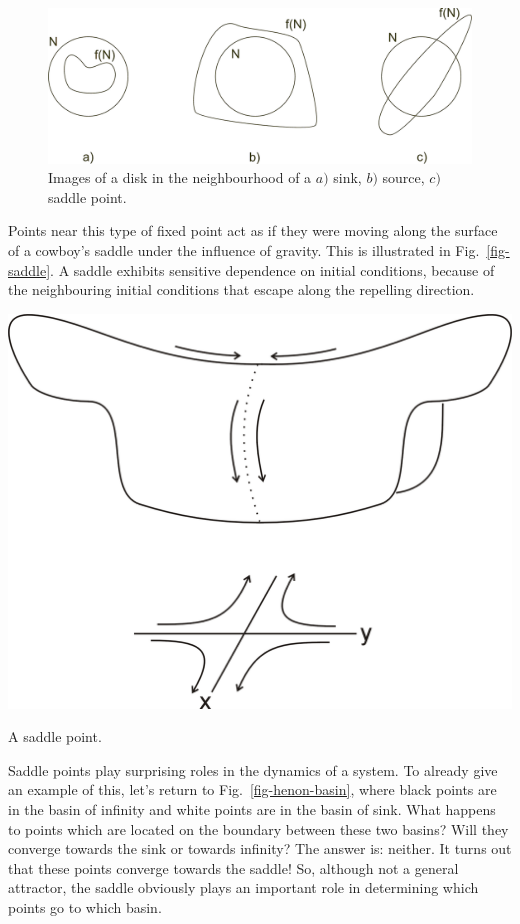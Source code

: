 \begin{figure}[h]
\centering
\includegraphics{dynamic/figures/circle_images}
\caption{Images of a disk in the neighbourhood of a $a)$ sink, $b)$ source, $c)$ saddle point.}
\label{fig-circle-images}
\end{figure} 

Points near this type of fixed point act as if they were moving along the surface of a cowboy's saddle under the influence of gravity. This is illustrated in Fig.~\ref{fig-saddle}. A saddle exhibits sensitive dependence on initial conditions, because of the neighbouring initial conditions that escape along the repelling direction.

\begin{marginfigure}
\centering
\includegraphics{dynamic/figures/saddle}
\caption{A saddle point.}
\label{fig-saddle}
\end{marginfigure} 

Saddle points play surprising roles in the dynamics of a system. To already give an example of this, let's return to Fig.~\ref{fig-henon-basin}, where black points are in the basin of infinity and white points are in the basin of sink. What happens to points which are located on the boundary between these two basins? Will they converge towards the sink or towards infinity? The answer is: neither. It turns out that these points converge towards the saddle! So, although not a general attractor, the saddle obviously plays an important role in determining which points go to which basin.

